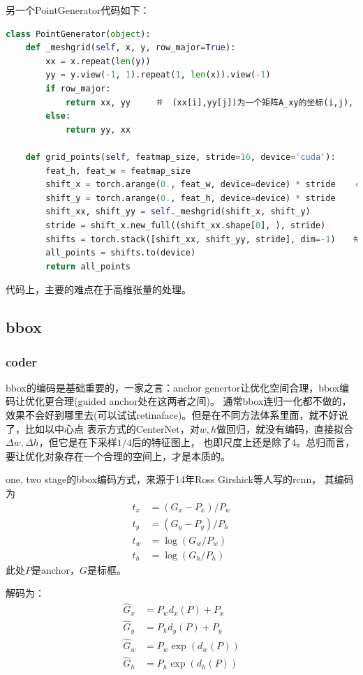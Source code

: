 \documentclass[UTF8]{ctexart}
\begin{document}
另一个PointGenerator代码如下：
\lstset{style=mystyle}
\begin{lstlisting}[language=Python]
class PointGenerator(object):
	def _meshgrid(self, x, y, row_major=True):
		xx = x.repeat(len(y))
		yy = y.view(-1, 1).repeat(1, len(x)).view(-1)
		if row_major:
			return xx, yy　　　＃　(xx[i],yy[j])为一个矩阵A_xy的坐标(i,j), dim(xx)=1时
		else:
			return yy, xx

	def grid_points(self, featmap_size, stride=16, device='cuda'):
		feat_h, feat_w = featmap_size
		shift_x = torch.arange(0., feat_w, device=device) * stride    # 特征网格对应到原图网格
		shift_y = torch.arange(0., feat_h, device=device) * stride
		shift_xx, shift_yy = self._meshgrid(shift_x, shift_y)
		stride = shift_x.new_full((shift_xx.shape[0], ), stride)
		shifts = torch.stack([shift_xx, shift_yy, stride], dim=-1)　　＃ x, y和对应点的stride大小
		all_points = shifts.to(device)
		return all_points
\end{lstlisting}

代码上，主要的难点在于高维张量的处理。

\subsection{bbox}

\subsubsection{coder}
bbox的编码是基础重要的，一家之言：anchor genertor让优化空间合理，bbox编码让优化更合理(guided anchor处在这两者之间)。
通常bbox连归一化都不做的，效果不会好到哪里去(可以试试retinaface)。但是在不同方法体系里面，就不好说了，比如以中心点
表示方式的CenterNet，对$w, h$做回归，就没有编码，直接拟合$\Delta w, \Delta h$，但它是在下采样$1/4$后的特征图上，
也即尺度上还是除了4。总归而言，要让优化对象存在一个合理的空间上，才是本质的。

one, two stage的bbox编码方式，来源于14年Ross Girshick等人写的rcnn，
其编码为
$$
\begin{aligned}
	t_{x} &=\left(G_{x}-P_{x}\right) / P_{w} \label{1} \\
	t_{y} &=\left(G_{y}-P_{y}\right) / P_{h} \label{2}\\
	t_{w} &=\log \left(G_{w} / P_{w}\right)  \label{3}\\
	t_{h} &=\log \left(G_{h} / P_{h}\right)  \label{4}
\end{aligned}
$$
此处$P$是anchor，$G$是标框。

解码为：
$$
\begin{aligned}
	\hat{G}_{x} &=P_{w} d_{x}(P)+P_{x} \\
	\hat{G}_{y} &=P_{h} d_{y}(P)+P_{y} \\
	\hat{G}_{w} &=P_{w} \exp \left(d_{w}(P)\right) \\
	\hat{G}_{h} &=P_{h} \exp \left(d_{h}(P)\right)
\end{aligned}
$$
\end{document}
